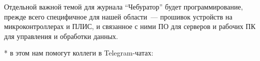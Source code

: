 Отдельной важной темой для журнала ``Чебуратор'' будет программирование, прежде
всего специфичное для нашей области\ ---  прошивок
устройств на микроконтроллерах и ПЛИС, и связанное с ними ПО для серверов и
рабочих ПК для управления и обработки данных.

\smallskip
* в этом нам помогут коллеги в Telegram-чатах: \cite{kosplay,samjun}
